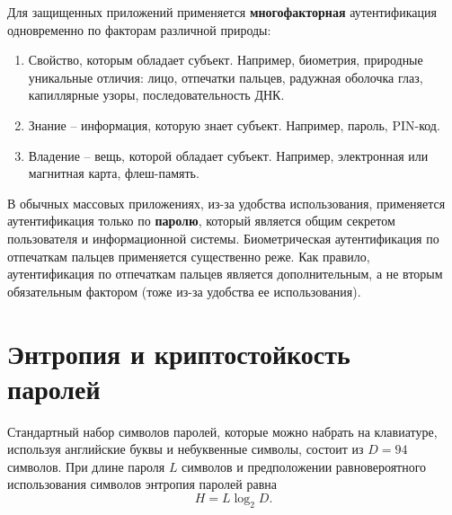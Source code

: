 \documentclass[10pt,a4paper]{book}
\begin{document}
Для защищенных приложений применяется \textbf{многофакторная} аутентификация одновременно по факторам различной природы:
\begin{enumerate}
    \item Свойство, которым обладает субъект. Например, биометрия, природные уникальные отличия: лицо, отпечатки пальцев, радужная оболочка глаз, капиллярные узоры, последовательность ДНК.
    \item Знание -- информация, которую знает субъект. Например, пароль, PIN-код.
    \item Владение -- вещь, которой обладает субъект. Например, электронная или магнитная карта, флеш-память.
\end{enumerate}

В обычных массовых приложениях, из-за удобства использования, применяется аутентификация только по \textbf{паролю}, который является общим секретом пользователя и информационной системы. Биометрическая аутентификация по отпечаткам пальцев применяется существенно реже. Как правило, аутентификация по отпечаткам пальцев является дополнительным, а не вторым обязательным фактором (тоже из-за удобства ее использования).



\section[Энтропия и криптостойкость паролей]{Энтропия и криптостойкость \protect\\ паролей}

Стандартный набор символов паролей, которые можно набрать на клавиатуре, используя английские буквы и небуквенные символы, состоит из $D=94$ символов. При длине пароля $L$ символов и предположении равновероятного использования символов энтропия паролей равна
    \[ H = L \log_2 D. \]
\end{document}
